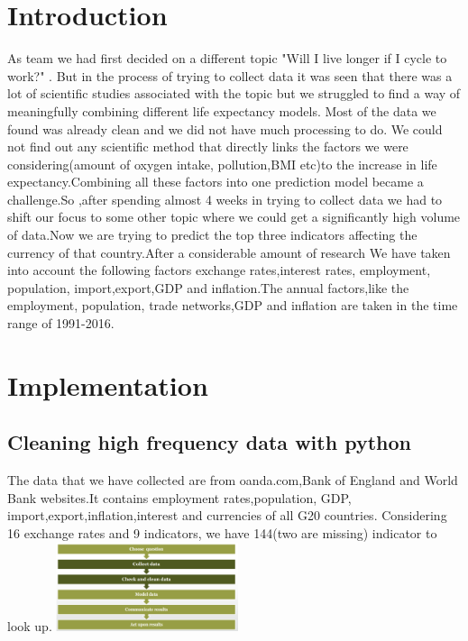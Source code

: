 \section{Introduction}
As team we had first decided on a different topic "Will I live longer if I cycle to work?" . But in the process of trying to collect data it was seen that there was a lot of scientific studies associated with the topic but we struggled to find a way of meaningfully combining different life expectancy models.  Most of the data we found was already clean and we did not have much processing to do\cite{iacono2008access}. We could not find out any scientific method that directly links the factors we were considering(amount of oxygen intake, pollution,BMI etc)to the increase in life expectancy\cite{edwards2014spinning}.Combining all these factors into one prediction model became a challenge.So ,after spending almost 4 weeks in trying to collect data we had to shift our focus to some other topic where we could get a significantly high volume of data.Now we are trying to predict the top three indicators affecting the currency of that country.After a considerable amount of research We have taken into account the following factors exchange rates,interest rates, employment, population, import,export,GDP and inflation\cite{kuruwitaarachchi2018design}.The annual factors,like the employment, population, trade networks,GDP and inflation are taken in the time range of 1991-2016.

\section{Implementation}
\subsection{Cleaning high frequency data with python} 
The data that we have collected are from oanda.com,Bank of England and World Bank websites.It contains employment rates,population, GDP, import,export,inflation,interest and currencies of all G20 countries\cite{kuruwitaarachchi2018design}. Considering 16 exchange rates and 9 indicators, we have 144(two are missing) indicator to look up.
\newline
\includegraphics[width=0.40\textwidth]{aa.png}

